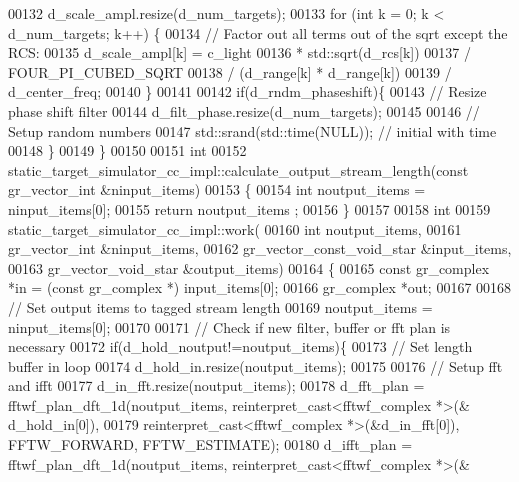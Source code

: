 \begin{DoxyCode}
00132         d_scale_ampl.resize(d\_num\_targets);
00133         \textcolor{keywordflow}{for} (\textcolor{keywordtype}{int} k = 0; k < d_num_targets; k++) \{
00134             \textcolor{comment}{// Factor out all terms out of the sqrt except the RCS:}
00135             d_scale_ampl[k] = c_light
00136                 * std::sqrt(d_rcs[k])
00137                 / FOUR\_PI\_CUBED\_SQRT
00138                 / (d_range[k] * d_range[k])
00139                 / d_center_freq;
00140         \}
00141 
00142         \textcolor{keywordflow}{if}(d_rndm_phaseshift)\{
00143             \textcolor{comment}{// Resize phase shift filter}
00144             d_filt_phase.resize(d\_num\_targets);
00145 
00146             \textcolor{comment}{// Setup random numbers}
00147             std::srand(std::time(NULL)); \textcolor{comment}{// initial with time}
00148         \}
00149     \}
00150 
00151     \textcolor{keywordtype}{int}
00152     static_target_simulator_cc_impl::calculate_output_stream_length(\textcolor{keyword}{const} gr\_vector\_int &ninput\_items)
00153     \{
00154         \textcolor{keywordtype}{int} noutput\_items = ninput\_items[0];
00155         \textcolor{keywordflow}{return} noutput\_items ;
00156     \}
00157 
00158     \textcolor{keywordtype}{int}
00159     static_target_simulator_cc_impl::work(
00160             \textcolor{keywordtype}{int} noutput\_items,
00161             gr\_vector\_int &ninput\_items,
00162             gr\_vector\_const\_void\_star &input\_items,
00163             gr\_vector\_void\_star &output\_items)
00164     \{
00165         \textcolor{keyword}{const} gr\_complex *in = (\textcolor{keyword}{const} gr\_complex *) input\_items[0];
00166         gr\_complex *out;
00167 
00168         \textcolor{comment}{// Set output items to tagged stream length}
00169         noutput\_items = ninput\_items[0];
00170 
00171         \textcolor{comment}{// Check if new filter, buffer or fft plan is necessary}
00172         \textcolor{keywordflow}{if}(d_hold_noutput!=noutput\_items)\{
00173             \textcolor{comment}{// Set length buffer in loop}
00174             d_hold_in.resize(noutput\_items);
00175 
00176             \textcolor{comment}{// Setup fft and ifft}
00177             d_in_fft.resize(noutput\_items);
00178             d_fft_plan = fftwf\_plan\_dft\_1d(noutput\_items, reinterpret\_cast<fftwf\_complex *>(&
      d_hold_in[0]),
00179                     reinterpret\_cast<fftwf\_complex *>(&d_in_fft[0]), FFTW\_FORWARD, FFTW\_ESTIMATE);
00180             d_ifft_plan = fftwf\_plan\_dft\_1d(noutput\_items, reinterpret\_cast<fftwf\_complex *>(&

\end{DoxyCode}
